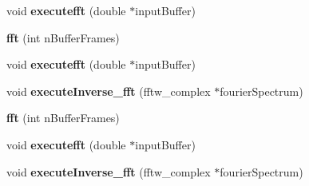 \begin{DoxyCompactItemize}
\item 
\hypertarget{classfft_a47e58fd4f715ad89a6fad8df9d715bf4}{void {\bfseries executefft} (double $\ast$input\-Buffer)}\label{classfft_a47e58fd4f715ad89a6fad8df9d715bf4}

\item 
\hypertarget{classfft_a5fff94ac07119207ddd05f628be5891d}{{\bfseries fft} (int n\-Buffer\-Frames)}\label{classfft_a5fff94ac07119207ddd05f628be5891d}

\item 
\hypertarget{classfft_a47e58fd4f715ad89a6fad8df9d715bf4}{void {\bfseries executefft} (double $\ast$input\-Buffer)}\label{classfft_a47e58fd4f715ad89a6fad8df9d715bf4}

\item 
\hypertarget{classfft_a228bd861564c189cd7b6800c950a1c09}{void {\bfseries execute\-Inverse\-\_\-fft} (fftw\-\_\-complex $\ast$fourier\-Spectrum)}\label{classfft_a228bd861564c189cd7b6800c950a1c09}

\item 
\hypertarget{classfft_a5fff94ac07119207ddd05f628be5891d}{{\bfseries fft} (int n\-Buffer\-Frames)}\label{classfft_a5fff94ac07119207ddd05f628be5891d}

\item 
\hypertarget{classfft_a47e58fd4f715ad89a6fad8df9d715bf4}{void {\bfseries executefft} (double $\ast$input\-Buffer)}\label{classfft_a47e58fd4f715ad89a6fad8df9d715bf4}

\item 
\hypertarget{classfft_a228bd861564c189cd7b6800c950a1c09}{void {\bfseries execute\-Inverse\-\_\-fft} (fftw\-\_\-complex $\ast$fourier\-Spectrum)}\label{classfft_a228bd861564c189cd7b6800c950a1c09}

\end{DoxyCompactItemize}
